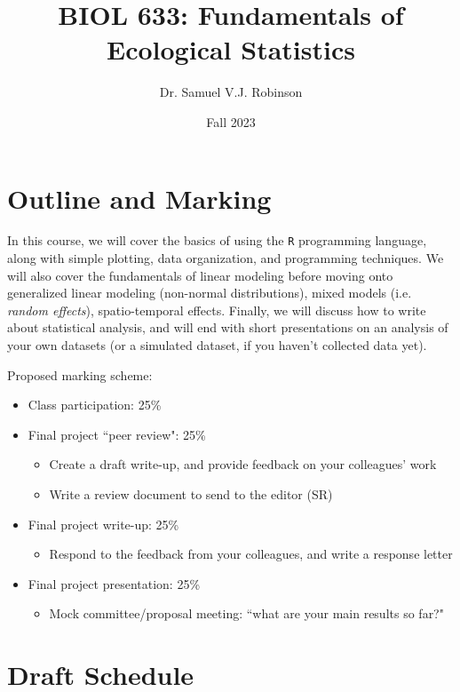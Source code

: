 \documentclass[11pt]{article}
\title{BIOL 633: Fundamentals of Ecological Statistics}
\author{Dr. Samuel V.J. Robinson}
\date{Fall 2023}
\begin{document}
\maketitle

\section*{Outline and Marking}

\large
In this course, we will cover the basics of using the \texttt{R} programming language, along with simple plotting, data organization, and programming techniques. We will also cover the fundamentals of linear modeling before moving onto generalized linear modeling (non-normal distributions), mixed models (i.e. \textit{random effects}), spatio-temporal effects. Finally, we will discuss how to write about statistical analysis, and will end with short presentations on an analysis of your own datasets (or a simulated dataset, if you haven't collected data yet).

\vspace{1cm}

Proposed marking scheme:
\begin{itemize}
  \item Class participation: 25\%
  \item Final project ``peer review": 25\%
  \begin{itemize}
    \item Create a draft write-up, and provide feedback on your colleagues' work
    \item Write a review document to send to the editor (SR)
  \end{itemize}
  \item Final project write-up: 25\%
  \begin{itemize}
    \item Respond to the feedback from your colleagues, and write a response letter
  \end{itemize}
  \item Final project presentation: 25\%
  \begin{itemize}
    \item Mock committee/proposal meeting: ``what are your main results so far?"
  \end{itemize}
\end{itemize}

\clearpage

\section*{Draft Schedule}
\end{document}
